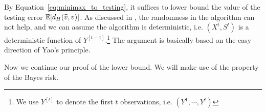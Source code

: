 
By Equation~\eqref{eq:minimax_to_testing}, it suffices to lower bound the value of the testing error $\operatorname*{\mathbb{E}}[d_H(\widehat{v},v)]$. 
As discussed in \cite{ACCD12,DJWW15}, the randomness in the algorithm can not help, and we can assume the algorithm is deterministic, i.e. $(X^t,S^t)$ is a deterministic function of $Y^{[t-1]}$.\footnote{We use $Y^{[t]}$ to denote the first $t$ observations, i.e. $(Y^1,\cdots,Y^t)$}
The argument is basically based on the easy direction of Yao's principle.

Now we continue our proof of the lower bound. We will make use of the property of the Bayes risk.

